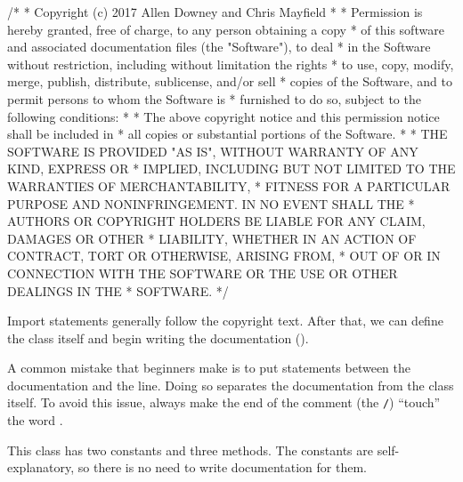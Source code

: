 
\begin{scriptsize}
\begin{code}
/*
 * Copyright (c) 2017 Allen Downey and Chris Mayfield
 *
 * Permission is hereby granted, free of charge, to any person obtaining a copy
 * of this software and associated documentation files (the "Software"), to deal
 * in the Software without restriction, including without limitation the rights
 * to use, copy, modify, merge, publish, distribute, sublicense, and/or sell
 * copies of the Software, and to permit persons to whom the Software is
 * furnished to do so, subject to the following conditions:
 *
 * The above copyright notice and this permission notice shall be included in
 * all copies or substantial portions of the Software.
 *
 * THE SOFTWARE IS PROVIDED "AS IS", WITHOUT WARRANTY OF ANY KIND, EXPRESS OR
 * IMPLIED, INCLUDING BUT NOT LIMITED TO THE WARRANTIES OF MERCHANTABILITY,
 * FITNESS FOR A PARTICULAR PURPOSE AND NONINFRINGEMENT. IN NO EVENT SHALL THE
 * AUTHORS OR COPYRIGHT HOLDERS BE LIABLE FOR ANY CLAIM, DAMAGES OR OTHER
 * LIABILITY, WHETHER IN AN ACTION OF CONTRACT, TORT OR OTHERWISE, ARISING FROM,
 * OUT OF OR IN CONNECTION WITH THE SOFTWARE OR THE USE OR OTHER DEALINGS IN THE
 * SOFTWARE.
 */
\end{code}
\end{scriptsize}

Import statements generally follow the copyright text.
After that, we can define the class itself and begin writing the documentation (\java{/**}).

\begin{code}
import java.util.Scanner;

/**
 * Methods for converting to/from the metric system.
 *
 * @author Allen Downey
 * @author Chris Mayfield
 * @version 6.1.5
 */
public class Convert {
\end{code}

A common mistake that beginners make is to put  statements between the documentation and the  line.
Doing so separates the documentation from the class itself.
To avoid this issue, always make the end of the comment (the \textcolor{comment}{\tt */}) ``touch'' the word .


This class has two constants and three methods.
The constants are self-explanatory, so there is no need to write documentation for them.

